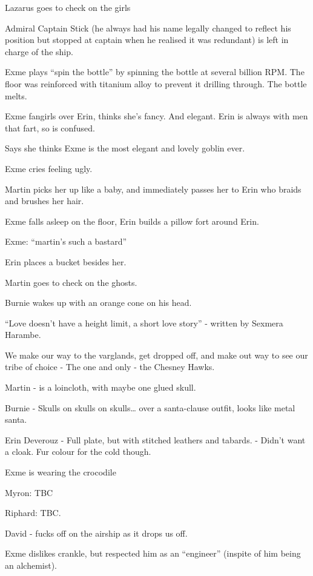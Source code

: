 Lazarus goes to check on the girls\medskip

Admiral Captain Stick (he always had his name legally changed to reflect his position but stopped at captain when he realised it was redundant) is left in charge of the ship.\medskip

Exme plays “spin the bottle” by spinning the bottle at several billion RPM. The floor was reinforced with titanium alloy to prevent it drilling through. The bottle melts.\medskip

Exme fangirls over Erin, thinks she’s fancy. And elegant. Erin is always with men that fart, so is confused.\medskip

Says she thinks Exme is the most elegant and lovely goblin ever.\medskip

Exme cries feeling ugly.\medskip

Martin picks her up like a baby, and immediately passes her to Erin who braids and brushes her hair.\medskip

Exme falls asleep on the floor, Erin builds a pillow fort around Erin.\medskip

Exme: “martin’s such a bastard”\medskip

Erin places a bucket besides her.\medskip

Martin goes to check on the ghosts.\medskip

Burnie wakes up with an orange cone on his head.\medskip

“Love doesn’t have a height limit, a short love story” - written by Sexmera Harambe.\medskip

We make our way to the varglands, get dropped off, and make out way to see our tribe of choice - The one and only - the Chesney Hawks.\medskip

Martin - is a loincloth, with maybe one glued skull.\medskip

Burnie - Skulls on skulls on skulls… over a santa-clause outfit, looks like metal santa.\medskip

Erin Deverouz - Full plate, but with stitched leathers and tabards. - Didn’t want a cloak. Fur colour for the cold though.\medskip

Exme is wearing the crocodile\medskip

Myron: TBC\medskip

Riphard: TBC.\medskip

David - fucks off on the airship as it drops us off.\medskip

Exme dislikes crankle, but respected him as an “engineer” (inspite of him being an alchemist).\medskip

